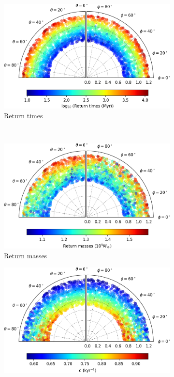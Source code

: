 \begin{figure}[h]
    \centering
    \begin{subfigure}[t]{0.4\textwidth}
        \includegraphics[width = \textwidth]{"../Files/Week 13/images/23_time"}
        \caption{Return times}
    \end{subfigure}
    ~ 
    \begin{subfigure}[t]{0.4\textwidth}
        \includegraphics[width=\textwidth]{"../Files/Week 13/images/23_mass"}
        \caption{Return masses}
    \end{subfigure}
    \begin{subfigure}[t]{0.4\textwidth}
        \includegraphics[width=\textwidth]{"../Files/Week 13/images/23_lyapunov"}

\end{subfigure}
\end{figure}
